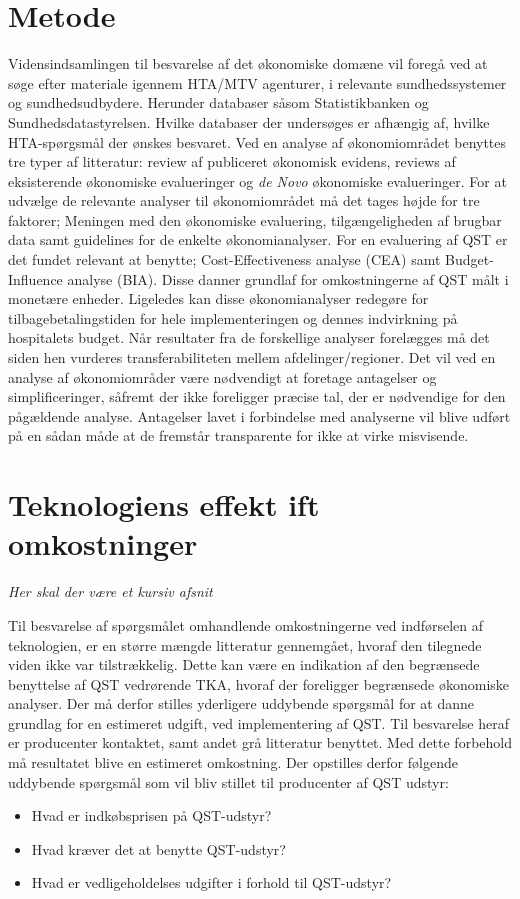 \section{Metode}
Vidensindsamlingen til besvarelse af det økonomiske domæne vil foregå ved at søge efter materiale igennem HTA/MTV agenturer, i relevante sundhedssystemer og sundhedsudbydere. Herunder databaser såsom Statistikbanken og Sundhedsdatastyrelsen. Hvilke databaser der undersøges er afhængig af, hvilke HTA-spørgsmål der ønskes besvaret. Ved en analyse af økonomiområdet benyttes tre typer af litteratur: review af publiceret økonomisk evidens, reviews af eksisterende økonomiske evalueringer og \textit{de Novo} økonomiske evalueringer. For at udvælge de relevante analyser til økonomiområdet må det tages højde for tre faktorer; Meningen med den økonomiske evaluering, tilgængeligheden af brugbar data samt guidelines for de enkelte økonomianalyser. For en evaluering af QST er det fundet relevant at benytte; Cost-Effectiveness analyse (CEA) samt Budget-Influence analyse (BIA). Disse danner grundlaf for omkostningerne af QST målt i monetære enheder. Ligeledes kan disse økonomianalyser redegøre for tilbagebetalingstiden for hele implementeringen og dennes indvirkning på hospitalets budget. Når resultater fra de forskellige analyser forelægges må det siden hen vurderes transferabiliteten mellem afdelinger/regioner. Det vil ved en analyse af økonomiområder være nødvendigt at foretage antagelser og simplificeringer, såfremt der ikke foreligger præcise tal, der er nødvendige for den pågældende analyse. Antagelser lavet i forbindelse med analyserne vil blive udført på en sådan måde at de fremstår transparente for ikke at virke misvisende. 

\section{Teknologiens effekt ift omkostninger}
\textit{Her skal der være et kursiv afsnit} 

Til besvarelse af spørgsmålet omhandlende omkostningerne ved indførselen af teknologien, er en større mængde litteratur gennemgået, hvoraf den tilegnede viden ikke var tilstrækkelig. Dette kan være en indikation af den begrænsede benyttelse af QST vedrørende TKA, hvoraf der foreligger begrænsede økonomiske analyser. Der må derfor stilles yderligere uddybende spørgsmål for at danne grundlag for en estimeret udgift, ved implementering af QST. Til besvarelse heraf er producenter kontaktet, samt andet grå litteratur benyttet. Med dette forbehold må resultatet blive en estimeret omkostning. 
Der opstilles derfor følgende uddybende spørgsmål som vil bliv stillet til producenter af QST udstyr:
\begin{itemize}  
\item Hvad er indkøbsprisen på QST-udstyr? 
\item Hvad kræver det at benytte QST-udstyr? 
\item Hvad er vedligeholdelses udgifter i forhold til QST-udstyr?
\end{itemize}


